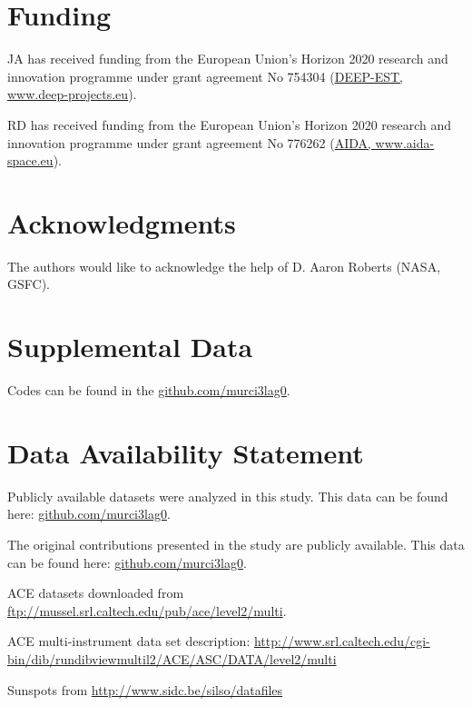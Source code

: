 \documentclass[utf8]{frontiersSCNS} %
\begin{document}
\section*{Funding}

JA has received funding from the European Union’s Horizon 2020 research and innovation programme under grant agreement No 754304 (\href{https://www.deep-projects.eu}{DEEP-EST, www.deep-projects.eu}).

RD has received funding from the European Union’s Horizon 2020 research and innovation programme under grant agreement No 776262 (\href{https://www.aida-space.eu}{AIDA, www.aida-space.eu}).

\section*{Acknowledgments}
The authors would like to acknowledge the help of D. Aaron Roberts (NASA, GSFC).

\section*{Supplemental Data}
Codes can be found in the \href{http://github.com/murci3lag0}{github.com/murci3lag0}.

\section*{Data Availability Statement}
\label{sec:repos}

Publicly available datasets were analyzed in this study. This data can be found here: \href{http://github.com/murci3lag0}{github.com/murci3lag0}.

The original contributions presented in the study are publicly available. This data can be found here: \href{http://github.com/murci3lag0}{github.com/murci3lag0}.

ACE datasets downloaded from \href{ftp://mussel.srl.caltech.edu/pub/ace/level2/multi}{ftp://mussel.srl.caltech.edu/pub/ace/level2/multi}.

ACE multi-instrument data set description: \href{http://www.srl.caltech.edu/cgi-bin/dib/rundibviewmultil2/ACE/ASC/DATA/level2/multi}{http://www.srl.caltech.edu/cgi-bin/dib/rundibviewmultil2/ACE/ASC/DATA/level2/multi}

Sunspots from \href{http://www.sidc.be/silso/datafiles}{http://www.sidc.be/silso/datafiles}

\end{document}
